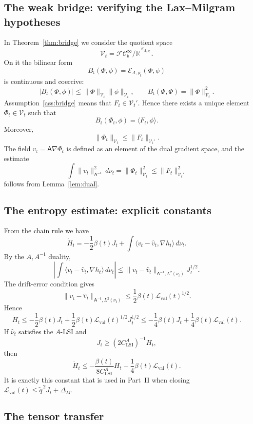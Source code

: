 \documentclass{article}
\newcommand{\Eval}{\mathcal L_{\mathrm{val}}}
\newcommand{\Asf}{\mathsf A}
\newcommand{\FC}{\mathcal{FC}_b^\infty}
\begin{document}
\subsection{The weak bridge: verifying the Lax--Milgram hypotheses}

In Theorem~\ref{thm:bridge} we consider the quotient space
\[
        \mathcal V_t=
        \overline{\FC/\mathbb R}^{\,\mathcal E_{A,\rho_t}}.
\]
On it the bilinear form
\[
        B_t(\Phi,\phi)=\mathcal E_{A,\rho_t}(\Phi,\phi)
\]
is continuous and coercive:
\[
        |B_t(\Phi,\phi)|
        \le
        \|\Phi\|_{\mathcal V_t}\|\phi\|_{\mathcal V_t},
        \qquad
        B_t(\Phi,\Phi)=\|\Phi\|_{\mathcal V_t}^2 .
\]
Assumption~\ref{ass:bridge} means that \(F_t\in\mathcal V_t'\). Hence there
exists a unique element \(\Phi_t\in\mathcal V_t\) such that
\[
        B_t(\Phi_t,\phi)=\langle F_t,\phi\rangle .
\]
Moreover,
\[
        \|\Phi_t\|_{\mathcal V_t}
        \le
        \|F_t\|_{\mathcal V_t'}.
\]
The field \(v_t=\Asf\nabla\Phi_t\) is defined as an element of the dual
gradient space, and the estimate
\[
        \int\|v_t\|_{\Asf^{-1}}^2\,d\nu_t
        =
        \|\Phi_t\|_{\mathcal V_t}^2
        \le
        \|F_t\|_{\mathcal V_t'}^2
\]
follows from Lemma~\ref{lem:dual}.

\subsection{The entropy estimate: explicit constants}

From the chain rule we have
\[
        \dot H_t
        =
        -\frac12\beta(t)J_t+
        \int\langle v_t-\hat v_t,\nabla h_t\rangle\,d\nu_t.
\]
By the \(A,A^{-1}\) duality,
\[
        \left|\int\langle v_t-\hat v_t,\nabla h_t\rangle\,d\nu_t\right|
        \le
        \|v_t-\hat v_t\|_{\Asf^{-1},L^2(\nu_t)}J_t^{1/2}.
\]
The drift-error condition gives
\[
        \|v_t-\hat v_t\|_{\Asf^{-1},L^2(\nu_t)}
        \le
        \frac12\beta(t)\Eval(t)^{1/2}.
\]
Hence
\[
        \dot H_t
        \le
        -\frac12\beta(t)J_t+
        \frac12\beta(t)\Eval(t)^{1/2}J_t^{1/2}
        \le
        -\frac14\beta(t)J_t+\frac14\beta(t)\Eval(t).
\]
If \(\hat\nu_t\) satisfies the \(A\)-LSI and
\[
        J_t\ge (2C_{\mathrm{LSI}}^A)^{-1}H_t,
\]
then
\[
        \dot H_t
        \le
        -\frac{\beta(t)}{8C_{\mathrm{LSI}}^A}H_t
        +\frac14\beta(t)\Eval(t).
\]
It is exactly this constant that is used in Part~II when closing
\(\Eval(t)\le\widetilde q^{\,2}J_t+\Delta_M\).

\subsection{The tensor transfer}
\end{document}
